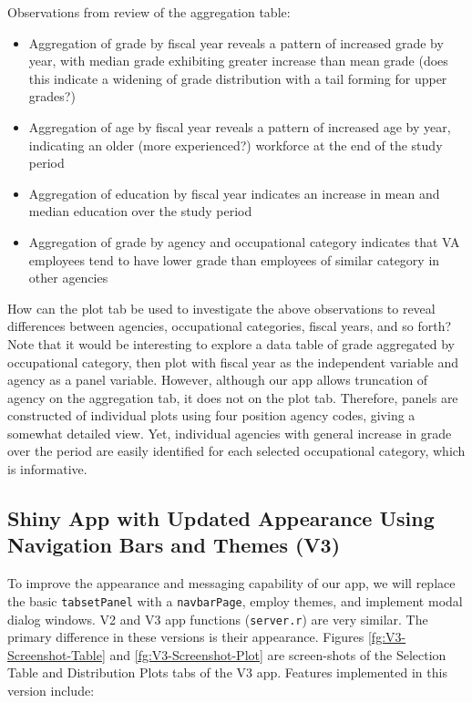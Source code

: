 \documentclass[10pt, letterpaper]{article}
\begin{document}
\begin{spacing}{1.0}
\begin{itemize}
\end{itemize}

Observations from review of the aggregation table:

\begin{itemize}
    \item Aggregation of grade by fiscal year reveals a pattern of increased grade by year, with median grade exhibiting greater increase than mean grade (does this indicate a widening of grade distribution with a tail forming for upper grades?)
    \item Aggregation of age by fiscal year reveals a pattern of increased age by year, indicating an older (more experienced?) workforce at the end of the study period
    \item Aggregation of education by fiscal year indicates an increase in mean and median education over the study period
    \item Aggregation of grade by agency and occupational category indicates that VA employees tend to have lower grade than employees of similar category in other agencies 
\end{itemize}

How can the plot tab be used to investigate the above observations to reveal differences between agencies, occupational categories, fiscal years, and so forth?  Note that it would be interesting to explore a data table of grade aggregated by occupational category, then plot with fiscal year as the independent variable and agency as a panel variable.  However, although our app allows truncation of agency on the aggregation tab, it does not on the plot tab.  Therefore, panels are constructed of individual plots using four position agency codes, giving a somewhat detailed view.  Yet, individual agencies with general increase in grade over the period are easily identified for each selected occupational category, which is informative.


\subsection{Shiny App with Updated Appearance Using Navigation Bars and Themes (V3)}\label{sec:appdev03}

To improve the appearance and messaging capability of our app, we will replace the basic \texttt{tabsetPanel} with a \texttt{navbarPage}, employ themes, and implement modal dialog windows.  V2 and V3 app functions (\texttt{server.r}) are very similar.  The primary difference in these versions is their appearance.  Figures \ref{fg:V3-Screenshot-Table} and \ref{fg:V3-Screenshot-Plot} are screen-shots of the Selection Table and Distribution Plots tabs of the V3 app.  Features implemented in this version include:


\end{spacing}
\end{document}
